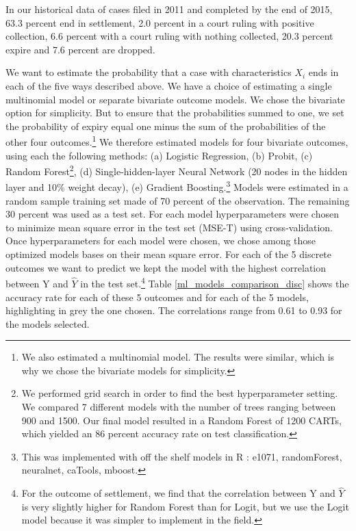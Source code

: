 In our historical data of cases filed in 2011 and completed by the end of 2015, 63.3 percent end in settlement, 2.0 percent in a court ruling with positive collection, 6.6 percent with a court ruling with nothing collected, 20.3 percent expire and 7.6 percent are dropped.


We want to estimate the probability that a case with characteristics $X_i$ ends in each of the five ways described above. We have a choice of estimating a single multinomial model or separate bivariate outcome models. We chose the bivariate option for simplicity. But to ensure that the  probabilities summed to one, we set the probability of expiry equal one minus the sum of the probabilities of the other four outcomes.\footnote{We also estimated a multinomial model. The results were similar, which is why we chose the bivariate models for simplicity.} We therefore estimated models for four bivariate outcomes, using each the following methods: (a) Logistic Regression, (b) Probit, (c) Random Forest\footnote{We performed grid search in order to find the best hyperparameter setting. We compared 7 different models with the number of trees ranging between 900 and 1500. Our final model resulted in a Random Forest of 1200 CARTs, which yielded an 86 percent accuracy rate on test classification.}, (d) Single-hidden-layer Neural Network (20 nodes in the hidden layer and 10\% weight decay), (e) Gradient Boosting.\footnote{This was implemented with off the shelf models in R : e1071, randomForest, neuralnet, caTools, mboost.}  Models were estimated in a random sample training set made of 70 percent of the observation. The remaining 30 percent was used as a test set. For each model hyperparameters were chosen to minimize mean square error in the test set (MSE-T) using cross-validation. Once hyperparameters for each model were chosen, we chose among those optimized models bases on their mean square error. For each of the 5 discrete outcomes we want to predict we kept the model with the highest correlation between Y and $\hat{Y}$ in the test set.\footnote{For the outcome of settlement, we find that the correlation between Y and $\hat{Y}$ is very slightly higher for Random Forest than for Logit, but we use the Logit model because it was simpler to implement in the field.} Table \ref{ml_models_comparison_disc} shows the accuracy rate for each of these 5 outcomes and for each of the 5 models, highlighting in grey the one chosen. The correlations range from 0.61 to 0.93 for the models selected. 





